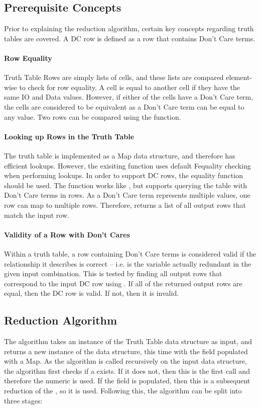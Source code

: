 \subsection{Prerequisite Concepts}
Prior to explaining the reduction algorithm, certain key concepts regarding truth tables are covered. A DC row is defined as a row that contains Don't Care terms.
\paragraph{Row Equality} 
Truth Table Rows are simply lists of cells, and these lists are compared element-wise to check for row equality. A cell is equal to another cell if they have the same IO and Data values. However, if either of the cells have a Don't Care term, the cells are considered to be equivalent as a Don't Care term can be equal to any value. Two rows can be compared using the  function.

\paragraph{Looking up Rows in the Truth Table}
The truth table is implemented as a Map data structure, and therefore has efficient lookups. However, the exisiting  function uses default F\fsharp equality checking when performing lookups. In order to support DC rows, the equality function  should be used. The function  works like , but supports querying the table with Don't Care terms in rows. As a Don't Care term represents multiple values, one row can map to multiple rows. Therefore,  returns a list of all output rows that match the input row.

\paragraph{Validity of a Row with Don't Cares}
Within a truth table, a row containing Don't Care terms is considered valid if the relationship it describes is correct -- i.e. is the variable actually redundant in the given input combination. This is tested by finding all output rows that correspond to the input DC row using . If all of the returned output rows are equal, then the DC row is valid. If not, then it is invalid.

\subsection{Reduction Algorithm}
The algorithm takes an instance of the Truth Table data structure as input, and returns a new instance of the data structure, this time with the  field populated with a Map. As the algorithm is called recursively on the input data structure, the algorithm first checks if a  exists. If it does not, then this is the first call and therefore the numeric  is used. If the field is populated, then this is a subsequent reduction of the , so it is used. Following this, the algorithm can be split into three stages:

